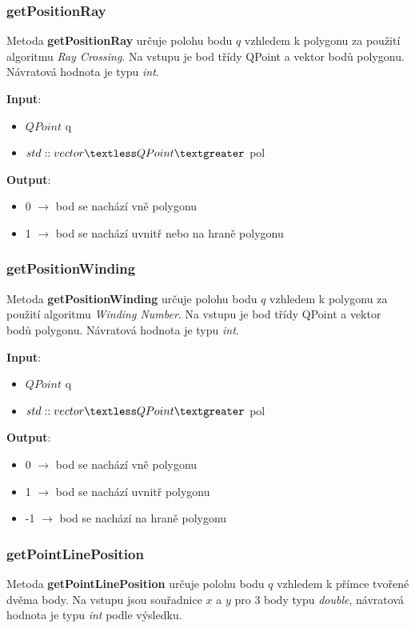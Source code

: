 \documentclass[a4paper, 12pt]{article}
\begin{document}
\subsubsection{getPositionRay}
Metoda \textbf{getPositionRay} určuje polohu bodu $q$ vzhledem k polygonu za použití algoritmu \textsl{Ray Crossing}. Na vstupu je bod třídy QPoint a vektor bodů polygonu. Návratová hodnota je typu \textsl{int}.

\textbf{Input}:
\begin{itemize}
\item $QPoint$ q
\item $std::vector\textless QPoint\textgreater$ pol
\end{itemize}

\textbf{Output}:
\begin{itemize}
\item 0 $\rightarrow$ bod se nachází vně polygonu
\item 1 $\rightarrow$ bod se nachází uvnitř nebo na hraně polygonu
\end{itemize}

\subsubsection{getPositionWinding}
Metoda \textbf{getPositionWinding} určuje polohu bodu $q$ vzhledem k polygonu za použití algoritmu \textsl{Winding Number}. Na vstupu je bod třídy QPoint a vektor bodů polygonu. Návratová hodnota je typu \textsl{int}.

\textbf{Input}:
\begin{itemize}
\item $QPoint$ q
\item $std::vector\textless QPoint\textgreater$ pol
\end{itemize}

\textbf{Output}:
\begin{itemize}
\item 0 $\rightarrow$ bod se nachází vně polygonu
\item 1 $\rightarrow$ bod se nachází uvnitř polygonu
\item -1 $\rightarrow$ bod se nachází na hraně polygonu
\end{itemize}

\subsubsection{getPointLinePosition}
Metoda \textbf{getPointLinePosition} určuje polohu bodu $q$ vzhledem k přímce tvořené dvěma body. Na vstupu jsou souřadnice $x$ a $y$ pro 3 body typu \textit{double}, návratová hodnota je typu \textit{int} podle výsledku. 
\end{document}
